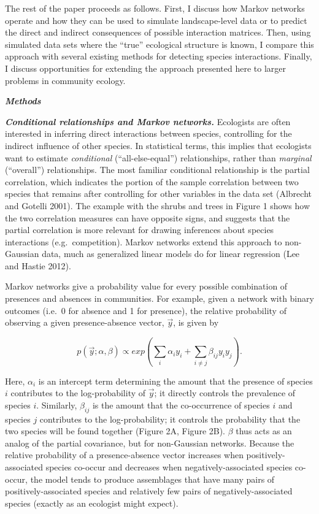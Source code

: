 \documentclass[12pt,]{article}
\begin{document}
\begin{spacing}{1.9}
\begin{flushleft}
The rest of the paper proceeds as follows. First, I discuss how Markov
networks operate and how they can be used to simulate landscape-level
data or to predict the direct and indirect consequences of possible
interaction matrices. Then, using simulated data sets where the ``true''
ecological structure is known, I compare this approach with several
existing methods for detecting species interactions. Finally, I discuss
opportunities for extending the approach presented here to larger
problems in community ecology.

\textbf{\emph{Methods}}

\textbf{\emph{Conditional relationships and Markov networks.}}
Ecologists are often interested in inferring direct interactions between
species, controlling for the indirect influence of other species. In
statistical terms, this implies that ecologists want to estimate
\emph{conditional} (``all-else-equal'') relationships, rather than
\emph{marginal} (``overall'') relationships. The most familiar
conditional relationship is the partial correlation, which indicates the
portion of the sample correlation between two species that remains after
controlling for other variables in the data set (Albrecht and Gotelli
2001). The example with the shrubs and trees in Figure 1 shows how the
two correlation measures can have opposite signs, and suggests that the
partial correlation is more relevant for drawing inferences about
species interactions (e.g.~competition). Markov networks extend this
approach to non-Gaussian data, much as generalized linear models do for
linear regression (Lee and Hastie 2012).

Markov networks give a probability value for every possible combination
of presences and absences in communities. For example, given a network
with binary outcomes (i.e.~0 for absence and 1 for presence), the
relative probability of observing a given presence-absence vector,
\(\vec{y}\), is given by

\[p(\vec{y}; \alpha, \beta) \propto exp(\sum_{i}\alpha_i y_i + \sum_{i\neq j}\beta_{ij}y_i y_j).\]

Here, \(\alpha_{i}\) is an intercept term determining the amount that
the presence of species \(i\) contributes to the log-probability of
\(\vec{y}\); it directly controls the prevalence of species \(i\).
Similarly, \(\beta_{ij}\) is the amount that the co-occurrence of
species \(i\) and species \(j\) contributes to the log-probability; it
controls the probability that the two species will be found together
(Figure 2A, Figure 2B). \(\beta\) thus acts as an analog of the partial
covariance, but for non-Gaussian networks. Because the relative
probability of a presence-absence vector increases when
positively-associated species co-occur and decreases when
negatively-associated species co-occur, the model tends to produce
assemblages that have many pairs of positively-associated species and
relatively few pairs of negatively-associated species (exactly as an
ecologist might expect).


\end{flushleft}
\end{spacing}
\end{document}
